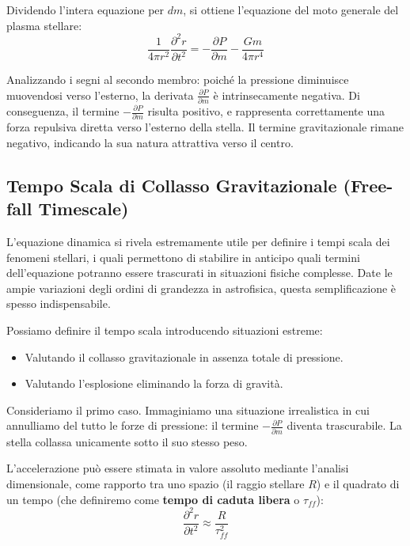 Dividendo l'intera equazione per $dm$, si ottiene l'equazione del moto generale del plasma stellare:
\begin{equation}
\frac{1}{4\pi r^2} \frac{\partial^2 r}{\partial t^2} = - \frac{\partial P}{\partial m} - \frac{G m}{4\pi r^4}
\end{equation}

Analizzando i segni al secondo membro: poiché la pressione diminuisce muovendosi verso l'esterno, la derivata $\frac{\partial P}{\partial m}$ è intrinsecamente negativa. Di conseguenza, il termine $-\frac{\partial P}{\partial m}$ risulta positivo, e rappresenta correttamente una forza repulsiva diretta verso l'esterno della stella. Il termine gravitazionale rimane negativo, indicando la sua natura attrattiva verso il centro.

\subsection{Tempo Scala di Collasso Gravitazionale (Free-fall Timescale)}

L'equazione dinamica si rivela estremamente utile per definire i tempi scala dei fenomeni stellari, i quali permettono di stabilire in anticipo quali termini dell'equazione potranno essere trascurati in situazioni fisiche complesse. Date le ampie variazioni degli ordini di grandezza in astrofisica, questa semplificazione è spesso indispensabile.

Possiamo definire il tempo scala introducendo situazioni estreme:
\begin{itemize}
\item Valutando il collasso gravitazionale in assenza totale di pressione.
\item Valutando l'esplosione eliminando la forza di gravità.
\end{itemize}

Consideriamo il primo caso. Immaginiamo una situazione irrealistica in cui annulliamo del tutto le forze di pressione: il termine $-\frac{\partial P}{\partial m}$ diventa trascurabile. La stella collassa unicamente sotto il suo stesso peso.

L'accelerazione può essere stimata in valore assoluto mediante l'analisi dimensionale, come rapporto tra uno spazio (il raggio stellare $R$) e il quadrato di un tempo (che definiremo come \textbf{tempo di caduta libera} o $\tau_{ff}$):
\begin{equation}
\frac{\partial^2 r}{\partial t^2} \approx \frac{R}{\tau_{ff}^2}
\end{equation}

